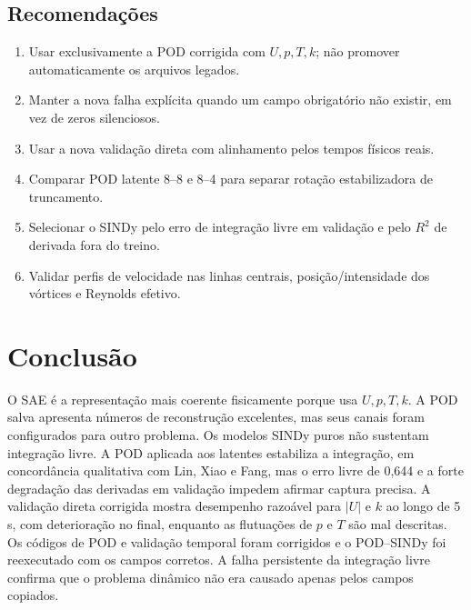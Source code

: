 \documentclass[12pt,a4paper]{article}
\begin{document}
\subsection*{Recomendações}
\begin{enumerate}
\item Usar exclusivamente a POD corrigida com $U,p,T,k$; não promover automaticamente os arquivos legados.
\item Manter a nova falha explícita quando um campo obrigatório não existir, em vez de zeros silenciosos.
\item Usar a nova validação direta com alinhamento pelos tempos físicos reais.
\item Comparar POD latente 8--8 e 8--4 para separar rotação estabilizadora de truncamento.
\item Selecionar o SINDy pelo erro de integração livre em validação e pelo $R^2$ de derivada fora do treino.
\item Validar perfis de velocidade nas linhas centrais, posição/intensidade dos vórtices e Reynolds efetivo.
\end{enumerate}

\section{Conclusão}
O SAE é a representação mais coerente fisicamente porque usa $U,p,T,k$. A POD salva apresenta números de reconstrução excelentes, mas seus canais foram configurados para outro problema. Os modelos SINDy puros não sustentam integração livre. A POD aplicada aos latentes estabiliza a integração, em concordância qualitativa com Lin, Xiao e Fang, mas o erro livre de 0,644 e a forte degradação das derivadas em validação impedem afirmar captura precisa. A validação direta corrigida mostra desempenho razoável para $|U|$ e $k$ ao longo de 5 s, com deterioração no final, enquanto as flutuações de $p$ e $T$ são mal descritas. Os códigos de POD e validação temporal foram corrigidos e o POD--SINDy foi reexecutado com os campos corretos. A falha persistente da integração livre confirma que o problema dinâmico não era causado apenas pelos campos copiados.
\end{document}
